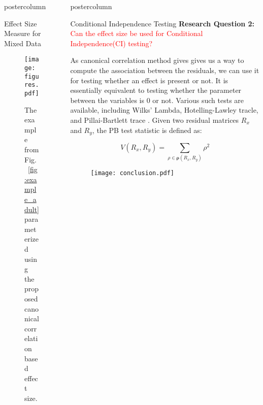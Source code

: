 \documentclass{beamer}
\newlength{\columnheight}
\begin{document}
\begin{frame}
\begin{columns}
\begin{column}{.33\textwidth}
\begin{beamercolorbox}[center]{postercolumn}
\begin{minipage}{.98\textwidth}
{\begin{myblock}{Effect Size Measure for Mixed Data}
		\begin{figure}
			\texttt{[image: figures.pdf]}
			\caption{The example from Fig.~\ref{fig:example_adult} parameterized using the proposed canonical correlation based effect size.}
		\end{figure}
	\end{myblock}\vfill
		}\end{minipage}\end{beamercolorbox}
	\end{column}


	\begin{column}{0.33\textwidth}
		\begin{beamercolorbox}[center]{postercolumn}
			\begin{minipage}{.98\textwidth} %
				\parbox[t][\columnheight]{\textwidth}{ %
	\begin{myblock}{Conditional Independence Testing}
		\textbf{Research Question 2:} \textcolor{red}{Can the effect size be used for Conditional Independence(CI) testing?}

		As canonical correlation method gives gives us a way to compute the association between the residuals, we can use it for testing whether 
		an effect is present or not. It is essentially equivalent to testing whether the parameter between the variables is $ 0 $ or not. Various
		such tests are available, including Wilks' Lambda, Hotelling-Lawley tracle, and Pillai-Bartlett trace \citep{}. Given two residual 
		matrices $ R_x $ and $ R_y $, the PB test statistic is defined as:

		\begin{equation*}
			V(R_x, R_y) = \sum_{\rho \in \bm{\rho}(R_x, R_y)} \rho^2
		\end{equation*}

		\begin{figure}
			\texttt{[image: conclusion.pdf]}
		\end{figure}


\end{myblock}}
\end{minipage}
\end{beamercolorbox}
\end{column}
\end{columns}
\end{frame}
\end{document}
